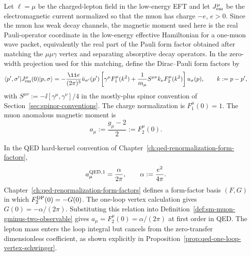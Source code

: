 \begin{definition}
\label{def:sm-muon-gminus-two-observable}
Let \(\ell=\mu\) be the charged-lepton field in the low-energy EFT and let
\(J_{\rm em}^\mu\) be the electromagnetic current normalized so that the muon
has charge \(-e\), \(e>0\).  Since the muon has weak decay channels, the
magnetic moment used here is the real Pauli-operator coordinate in the
low-energy effective Hamiltonian for a one-muon wave packet, equivalently the
real part of the Pauli form factor obtained after matching the
\(\mu\mu\gamma\) vertex and separating absorptive decay operators.  In the
zero-width projection used for this matching, define the Dirac--Pauli form
factors by
\begin{equation}
  \langle p',\sigma'|J_{\rm em}^\mu(0)|p,\sigma\rangle
  =
  -\frac{\ii e}{(2\pi)^3}
  \bar u_{\sigma'}(p')
  \left[
    \gamma^\mu F_1^\mu(k^2)
    +
    \frac1{m_\mu}S^{\mu\nu}k_\nu F_2^\mu(k^2)
  \right]
  u_\sigma(p),
  \qquad k:=p-p',
  \label{eq:sm-muon-dirac-pauli-form-factors}
\end{equation}
with \(S^{\mu\nu}:=-\ii[\gamma^\mu,\gamma^\nu]/4\) in the mostly-plus
spinor convention of Section~\ref{sec:spinor-conventions}.  The charge
normalization is \(F_1^\mu(0)=1\).  The muon anomalous magnetic moment is
\begin{equation}
  a_\mu:=\frac{g_\mu-2}{2}:=F_2^\mu(0).
  \label{eq:sm-muon-anomalous-magnetic-moment}
\end{equation}
\end{definition}

In the QED hard-kernel convention of
Chapter~\ref{ch:qed-renormalization-form-factors},
\begin{equation}
  a_\mu^{\rm QED,1}=\frac{\alpha}{2\pi},
  \qquad
  \alpha:=\frac{e^2}{4\pi}.
  \label{eq:sm-muon-schwinger-term}
\end{equation}
Chapter~\ref{ch:qed-renormalization-form-factors} defines a form-factor basis
\((F,G)\) in which \(F_2^{\rm DP}(0)=-G(0)\).  The one-loop vertex
calculation gives \(G(0)=-\alpha/(2\pi)\).  Substituting this relation into
Definition~\ref{def:sm-muon-gminus-two-observable} gives
\(a_\mu=F_2^\mu(0)=\alpha/(2\pi)\) at first order in QED.  The lepton mass
enters the loop integral but cancels from the zero-transfer dimensionless
coefficient, as shown explicitly in
Proposition~\ref{prop:qed-one-loop-vertex-schwinger}.


